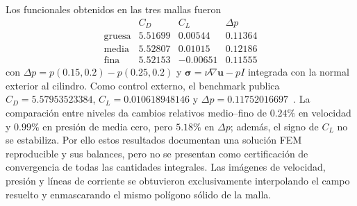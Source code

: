 Los funcionales obtenidos en las tres mallas fueron
\[
\begin{array}{c|rrr}
 & C_D & C_L & \Delta p\\\hline
\text{gruesa} & 5.51699 & 0.00544 & 0.11364\\
\text{media}  & 5.52807 & 0.01015 & 0.12186\\
\text{fina}   & 5.52153 & -0.00651 & 0.11555
\end{array}
\]
con \(\Delta p=p(0.15,0.2)-p(0.25,0.2)\) y
\(\boldsymbol\sigma=\nu\nabla\mathbf u-pI\) integrada con la normal
exterior al cilindro. Como control externo, el benchmark publica
\(C_D=5.57953523384\), \(C_L=0.010618948146\) y
\(\Delta p=0.11752016697\)~\cite{dfgRe20}. La comparación entre niveles da
 cambios relativos medio--fino de \(0.24\%\) en velocidad y \(0.99\%\) en
 presión de media cero, pero \(5.18\%\) en \(\Delta p\); además, el signo de
 \(C_L\) no se estabiliza. Por ello estos resultados documentan una solución
 FEM reproducible y sus balances, pero no se presentan como certificación de
 convergencia de todas las cantidades integrales. Las imágenes de velocidad,
 presión y líneas de corriente se obtuvieron exclusivamente interpolando el
 campo resuelto y enmascarando el mismo polígono sólido de la malla.
